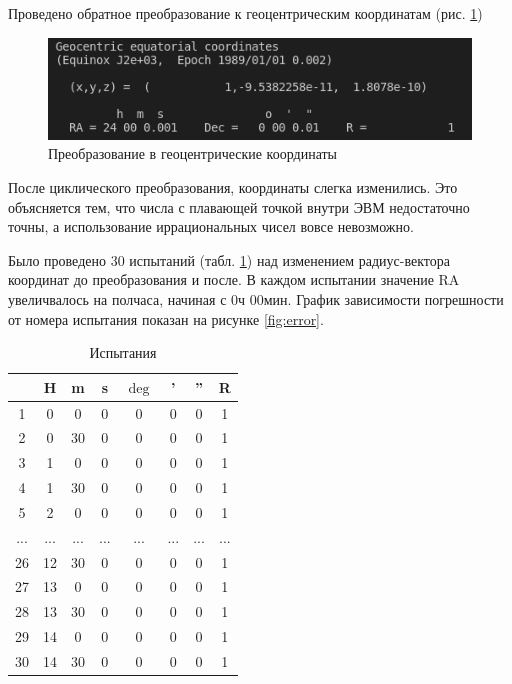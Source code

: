 \documentclass[14pt,a4paper]{extarticle}%
\begin{document}
Проведено обратное преобразование к геоцентрическим координатам (рис. \ref{fig:geo})

\begin{figure}[H]
  \centering
  \includegraphics[scale=1.0]{geo.png}
  \caption{Преобразование в геоцентрические координаты}
  \label{fig:geo}
\end{figure}


После циклического преобразования, координаты слегка изменились.
Это объясняется тем, что числа с плавающей точкой внутри ЭВМ недостаточно точны,
а использование иррациональных чисел вовсе невозможно.

Было проведено 30 испытаний (табл. \ref{tbl:tries}) над изменением радиус-вектора координат до преобразования
и после. В каждом испытании значение RA увеличвалось на полчаса, начиная с 0ч 00мин.
График зависимости погрешности от номера испытания показан на рисунке \ref{fig:error}.

\begin{table}[H]
  \centering
  \begin{tabular}{cccccccc}
    \toprule
    {} & H &  m &      s &      $\deg$ &   ' &    '' & R \\
    \midrule
    1  &   0 &   0 &  0 &  0 &  0 &  0 & 1 \\
    2  &   0 &   30 &  0 &  0 &  0 &  0 & 1 \\
    3  &   1 &   0 &  0 &  0 &  0 &  0 & 1 \\
    4  &   1 &   30 &  0 &  0 &  0 &  0 & 1 \\
    5  &   2 &   0 &  0 &  0 &  0 &  0 & 1 \\
    ...  &   ... &   ... &  ... &  ... &  ... &  ... & ... \\
    26  &   12 &   30 &  0 &  0 &  0 &  0 & 1 \\
    27  &   13 &   0 &  0 &  0 &  0 &  0 & 1 \\
    28  &   13 &   30 &  0 &  0 &  0 &  0 & 1 \\
    29  &   14 &   0 &  0 &  0 &  0 &  0 & 1 \\
    30  &   14 &   30 &  0 &  0 &  0 &  0 & 1 \\
    \bottomrule
  \end{tabular}
  \caption{Испытания}
  \label{tbl:tries}
\end{table}
\end{document}
